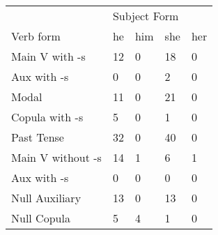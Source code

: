 \begin{table}[]
\begin{minipage}{0.5\textwidth}
\end{minipage}
\begin{minipage}{0.5\textwidth}
\centering
    \begin{tabular}{@{}lllll@{}}
        \toprule
            &\multicolumn{4}{l}{Subject Form}\\
            \cline{2-5}
        Verb form & he & him & she & her \\
        \midrule
        Main V with -s & 12 & 0 & 18 & 0 \\
        Aux with -s & 0 & 0 & 2 & 0 \\
        Modal & 11 & 0 & 21 & 0 \\
        Copula with -s & 5 & 0 & 1 & 0 \\
        Past Tense & 32 & 0 & 40 & 0 \\
        \hline
        Main V without -s & 14 & 1 & 6 & 1 \\
        Aux with -s & 0 & 0 & 0 & 0 \\
        Null Auxiliary & 13 & 0 & 13 & 0 \\
        Null Copula & 5 & 4 & 1 & 0 \\
        \bottomrule
    \end{tabular}
    \end{minipage}
\end{table}

